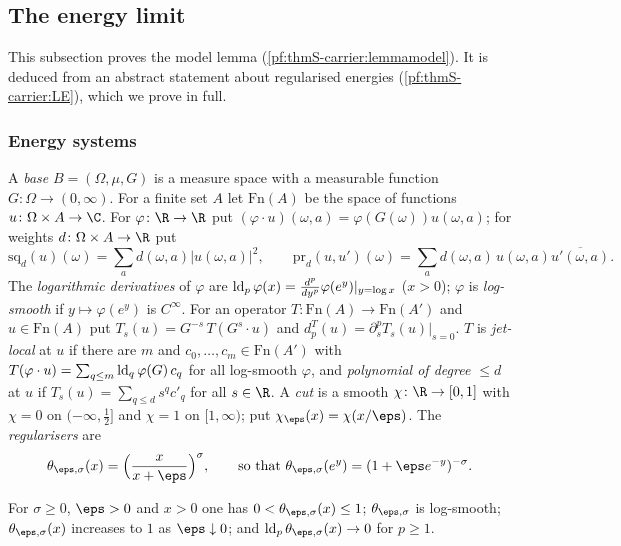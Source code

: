 \subsection{The energy limit}\label{sec:pf:thmS-carrier:LE}

This subsection proves the model lemma (\cref{pf:thmS-carrier:lemmamodel}). It is deduced from an abstract statement about
regularised energies (\cref{pf:thmS-carrier:LE}), which we prove in full.

\subsubsection{Energy systems}
\begin{definition}\label{pf:thmS-carrier:base}
A \emph{base} $B=(\Omega,\mu,G)$ is a measure space with a measurable function $G\colon\Omega\to(0,\infty)$. For a finite set
$A$ let $\mathrm{Fn}(A)$ be the space of functions $u\colon\Omega\times A\to\C$. For $\varphi\colon\R\to\R$ put
$(\varphi\cdot u)(\omega,a)=\varphi(G(\omega))u(\omega,a)$; for weights $d\colon\Omega\times A\to\R$ put
\[
\mathrm{sq}_d(u)(\omega)=\sum_ad(\omega,a)|u(\omega,a)|^2,\qquad
\mathrm{pr}_d(u,u')(\omega)=\sum_ad(\omega,a)\,u(\omega,a)\overline{u'(\omega,a)} .
\]
The \emph{logarithmic derivatives} of $\varphi$ are $\operatorname{ld}_p\varphi(x)=\frac{d^p}{dy^p}\varphi(e^y)|_{y=\log x}$
($x>0$); $\varphi$ is \emph{log-smooth} if $y\mapsto\varphi(e^y)$ is $C^\infty$. For an operator $T\colon\mathrm{Fn}(A)\to
\mathrm{Fn}(A')$ and $u\in\mathrm{Fn}(A)$ put $T_s(u)=G^{-s}\,T(G^s\cdot u)$ and $d^T_p(u)=\partial_s^pT_s(u)|_{s=0}$. $T$ is
\emph{jet-local} at $u$ if there are $m$ and $c_0,\dots,c_m\in\mathrm{Fn}(A')$ with $T(\varphi\cdot u)=\sum_{q\le m}
\operatorname{ld}_q\varphi(G)\,c_q$ for all log-smooth $\varphi$, and \emph{polynomial of degree $\le d$} at $u$ if
$T_s(u)=\sum_{q\le d}s^qc'_q$ for all $s\in\R$. A \emph{cut} is a smooth $\chi\colon\R\to[0,1]$ with $\chi=0$ on
$(-\infty,\frac12]$ and $\chi=1$ on $[1,\infty)$; put $\chi_\eps(x)=\chi(x/\eps)$. The \emph{regularisers} are
\[
\theta_{\eps,\sigma}(x)=\Bigl(\frac{x}{x+\eps}\Bigr)^{\sigma},\qquad\text{so that }\theta_{\eps,\sigma}(e^y)=
(1+\eps e^{-y})^{-\sigma}.
\]
\end{definition}

For $\sigma\ge0$, $\eps>0$ and $x>0$ one has $0<\theta_{\eps,\sigma}(x)\le1$; $\theta_{\eps,\sigma}$ is log-smooth;
$\theta_{\eps,\sigma}(x)$ increases to $1$ as $\eps\downarrow0$; and $\thmScarrierld_p\theta_{\eps,\sigma}(x)\to0$ for
$p\ge1$.

